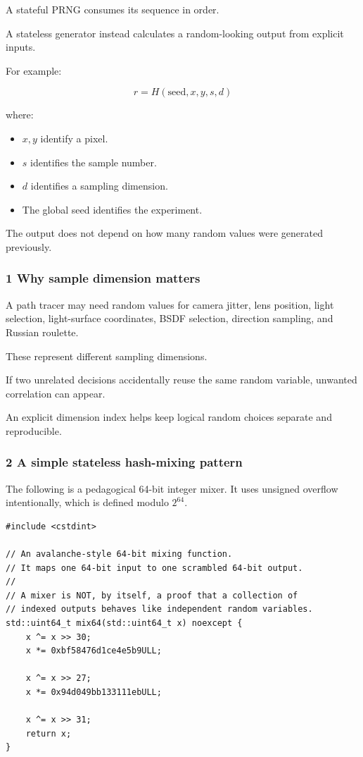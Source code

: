 A stateful PRNG consumes its sequence in order.

A stateless generator instead calculates a random-looking output from explicit inputs.

For example:

\[
 \boxed{ r=H(\text{seed},x,y,s,d) }
\]

where:

\begin{itemize}
\tightlist
\item
  \(x,y\) identify a pixel.
\item
  \(s\) identifies the sample number.
\item
  \(d\) identifies a sampling dimension.
\item
  The global seed identifies the experiment.
\end{itemize}

The output does not depend on how many random values were generated previously.

\subsubsection{1 Why sample dimension matters}\label{02-foundations-ii-ch029-why-sample-dimension-matters}

A path tracer may need random values for camera jitter, lens position, light selection, light-surface coordinates, BSDF selection, direction sampling, and Russian roulette.

These represent different sampling dimensions.

If two unrelated decisions accidentally reuse the same random variable, unwanted correlation can appear.

An explicit dimension index helps keep logical random choices separate and reproducible.

\subsubsection{2 A simple stateless hash-mixing pattern}\label{02-foundations-ii-ch029-a-simple-stateless-hash-mixing-pattern}

The following is a pedagogical 64-bit integer mixer. It uses unsigned overflow intentionally, which is defined modulo \(2^{64}\).

\begin{verbatim}
#include <cstdint>

// An avalanche-style 64-bit mixing function.
// It maps one 64-bit input to one scrambled 64-bit output.
//
// A mixer is NOT, by itself, a proof that a collection of
// indexed outputs behaves like independent random variables.
std::uint64_t mix64(std::uint64_t x) noexcept {
    x ^= x >> 30;
    x *= 0xbf58476d1ce4e5b9ULL;

    x ^= x >> 27;
    x *= 0x94d049bb133111ebULL;

    x ^= x >> 31;
    return x;
}
\end{verbatim}

